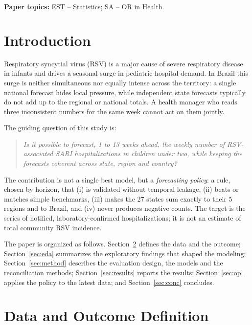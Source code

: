 \documentclass[12pt,a4paper]{article}
\begin{document}
\noindent\textbf{Paper topics:} EST -- Statistics; SA -- OR in Health.

\newpage
\section{Introduction}

Respiratory syncytial virus (RSV) is a major cause of severe respiratory disease in infants and drives a seasonal surge in pediatric hospital demand. In Brazil this surge is neither simultaneous nor equally intense across the territory: a single national forecast hides local pressure, while independent state forecasts typically do not add up to the regional or national totals. A health manager who reads three inconsistent numbers for the same week cannot act on them jointly.

The guiding question of this study is:

\begin{quote}
\emph{Is it possible to forecast, 1 to 13 weeks ahead, the weekly number of RSV-associated SARI hospitalizations in children under two, while keeping the forecasts coherent across state, region and country?}
\end{quote}

The contribution is not a single best model, but a \emph{forecasting policy}: a rule, chosen by horizon, that (i) is validated without temporal leakage, (ii) beats or matches simple benchmarks, (iii) makes the 27 states sum exactly to their 5 regions and to Brazil, and (iv) never produces negative counts. The target is the series of notified, laboratory-confirmed hospitalizations; it is not an estimate of total community RSV incidence.

The paper is organized as follows. Section~\ref{sec:data} defines the data and the outcome; Section~\ref{sec:eda} summarizes the exploratory findings that shaped the modeling; Section~\ref{sec:method} describes the evaluation design, the models and the reconciliation methods; Section~\ref{sec:results} reports the results; Section~\ref{sec:op} applies the policy to the latest data; and Section~\ref{sec:conc} concludes.

\section{Data and Outcome Definition}\label{sec:data}
\end{document}
